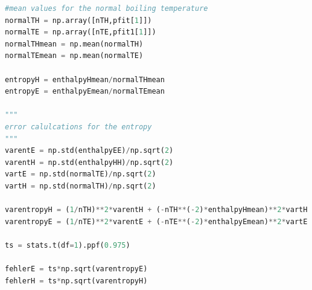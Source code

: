 \documentclass[a4paper,abstracton]{article}	                       %
\begin{document}
\begin{lstlisting}[language=Python]
#mean values for the normal boiling temperature
normalTH = np.array([nTH,pfit[1]])
normalTE = np.array([nTE,pfit1[1]])
normalTHmean = np.mean(normalTH)
normalTEmean = np.mean(normalTE)

entropyH = enthalpyHmean/normalTHmean
entropyE = enthalpyEmean/normalTEmean

"""
error calulcations for the entropy
"""
varentE = np.std(enthalpyEE)/np.sqrt(2)
varentH = np.std(enthalpyHH)/np.sqrt(2)
vartE = np.std(normalTE)/np.sqrt(2)
vartH = np.std(normalTH)/np.sqrt(2)

varentropyH = (1/nTH)**2*varentH + (-nTH**(-2)*enthalpyHmean)**2*vartH
varentropyE = (1/nTE)**2*varentE + (-nTE**(-2)*enthalpyEmean)**2*vartE

ts = stats.t(df=1).ppf(0.975)

fehlerE = ts*np.sqrt(varentropyE)
fehlerH = ts*np.sqrt(varentropyH)

\end{lstlisting}
\clearpage
\end{document}
